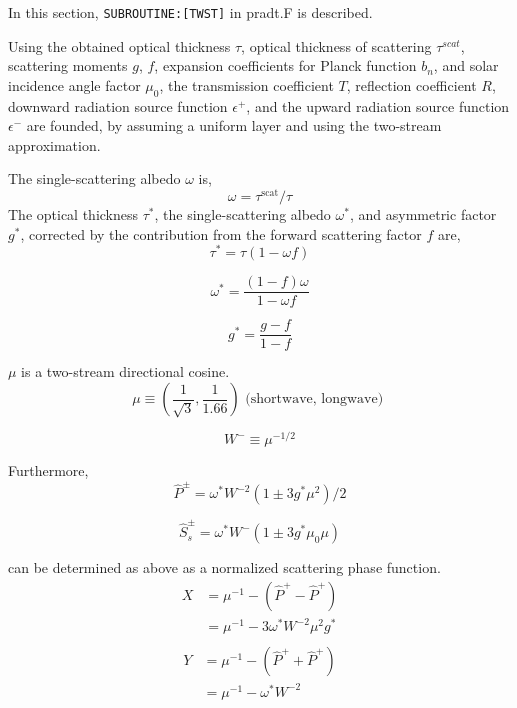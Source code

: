 In this section, \texttt{SUBROUTINE:{[}TWST{]}} in pradt.F is described.

Using the obtained optical thickness \(\tau\), optical thickness of
scattering \(\tau^{scat}\), scattering moments \(g\), \(f\), expansion
coefficients for Planck function \(b_n\), and solar incidence angle
factor \(\mu_{0}\), the transmission coefficient \(T\), reflection
coefficient \(R\), downward radiation source function \(\epsilon^{+}\),
and the upward radiation source function \(\epsilon^{-}\) are founded,
by assuming a uniform layer and using the two-stream approximation.

The single-scattering albedo \(\omega\) is, \begin{equation}
\omega=\tau^{\text{scat}}/\tau
\end{equation} The optical thickness \(\tau^{*}\), the single-scattering albedo
\(\omega^{*}\), and asymmetric factor \(g^{*}\), corrected by the
contribution from the forward scattering factor \(f\) are, \begin{equation}
\tau^{*}=\tau(1-\omega f)
\end{equation}

\begin{equation}
\omega^{*}=\frac{(1-f) \omega}{1-\omega f}
\end{equation}

\begin{equation}
g^{*}=\frac{g-f}{1-f}
\end{equation}

\(\mu\) is a two-stream directional cosine. \begin{equation}
\mu \equiv\left(\frac{1}{\sqrt{3}}, \frac{1}{1.66}\right) \text { (shortwave, longwave) }
\end{equation}

\begin{equation}
W^{-} \equiv \mu^{-1 / 2}
\end{equation}

Furthermore, \begin{equation}
\hat{P}^{\pm}=\omega^{*} W^{-2}\left(1 \pm 3 g^{*} \mu^{2}\right) / 2
\end{equation}

\begin{equation}
\hat{S}_{s}^{\pm}=\omega^{*} W^{-}\left(1 \pm 3 g^{*} \mu_{0} \mu\right)
\end{equation}

can be determined as above as a normalized scattering phase function. \begin{equation}
\begin{aligned}
X &=\mu^{-1}-\left(\hat{P}^{+}-\hat{P}^{+}\right) \\
&=\mu^{-1}-3 \omega^{*} W^{-2} \mu^{2} g^{*} \\
\end{aligned}
\end{equation} \begin{equation}
\begin{aligned}
Y &=\mu^{-1}-\left(\hat{P}^{+}+\hat{P}^{+}\right) \\
&=\mu^{-1}-\omega^{*} W^{-2} \\
\end{aligned}
\end{equation}

